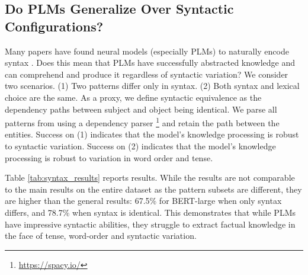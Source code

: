 \subsection{Do PLMs Generalize Over Syntactic Configurations?} 



Many papers have found neural models (especially PLMs) to naturally
encode syntax
\cite{linzen2016assessing,belinkov2017neural,marvin-linzen-2018-targeted,belinkov2019analysis,yoav-syntax,hewitt2019structural}.
Does this mean that PLMs have successfully abstracted
knowledge and can comprehend and produce it regardless of
syntactic variation?
We consider two scenarios. (1) Two patterns differ only in
syntax. (2) Both  syntax and  lexical choice are the same.
As a proxy, we define syntactic equivalence as the dependency
paths between subject and object being identical.
We parse all patterns from \resource{} using a dependency parser \cite{spacy}\footnote{\url{https://spacy.io/}} and retain the path between the entities.
Success on (1) indicates
that the model's knowledge processing is robust to syntactic
variation.
Success on (2) indicates
that the model's knowledge processing is robust to
variation in word order and tense.




Table \ref{tab:syntax_results}
reports results.
While the results are not comparable to the main results on
the entire dataset as the pattern subsets are different,
they are higher than the general results: 67.5\% for BERT-large when only 
syntax differs, and 78.7\% when syntax is
identical. This demonstrates that while PLMs have impressive syntactic abilities, 
they struggle to extract factual knowledge in the face of
tense, word-order and syntactic variation.

